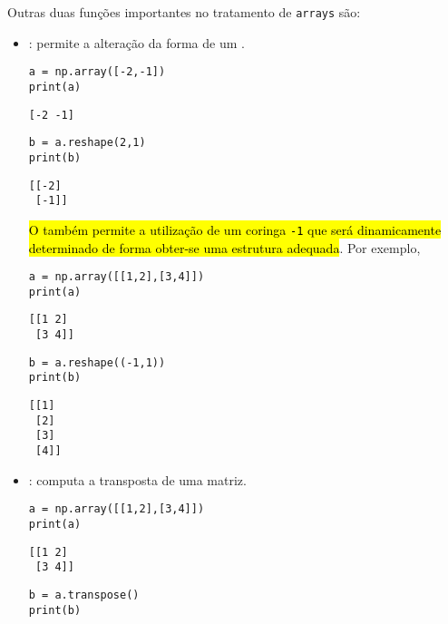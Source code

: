 Outras duas funções importantes no tratamento de \texttt{arrays} são:
\begin{itemize}
\item \hl{\PYTHONnumpyDOTreshape}: permite a alteração da forma de um {\PYTHONnumpyDOTarray}.
  
\begin{lstlisting}[framexrightmargin=-2.4em]
a = np.array([-2,-1])
print(a)
\end{lstlisting}

\begin{verbatim}
[-2 -1]
\end{verbatim}

\begin{lstlisting}[framexrightmargin=-2.4em]
b = a.reshape(2,1)
print(b)
\end{lstlisting}

\begin{verbatim}
[[-2]
 [-1]]
\end{verbatim}

\hl{O {\PYTHONnumpyDOTreshape} também permite a utilização de um coringa \texttt{-1} que será dinamicamente determinado de forma obter-se uma estrutura adequada}. Por exemplo,

\begin{lstlisting}[framexrightmargin=-2.4em]
a = np.array([[1,2],[3,4]])
print(a)
\end{lstlisting}

\begin{verbatim}
[[1 2]
 [3 4]]
\end{verbatim}

\begin{lstlisting}[framexrightmargin=-2.4em]
b = a.reshape((-1,1))
print(b)
\end{lstlisting}

\begin{verbatim}
[[1]
 [2]
 [3]
 [4]]
\end{verbatim}

\item \hl{\PYTHONnumpyDOTtranspose}: computa a transposta de uma matriz.

\begin{lstlisting}[framexrightmargin=-2.4em]
a = np.array([[1,2],[3,4]])
print(a)
\end{lstlisting}

\begin{verbatim}
[[1 2]
 [3 4]]
\end{verbatim}

\begin{lstlisting}[framexrightmargin=-2.4em]
b = a.transpose()
print(b)
\end{lstlisting}


\end{itemize}
